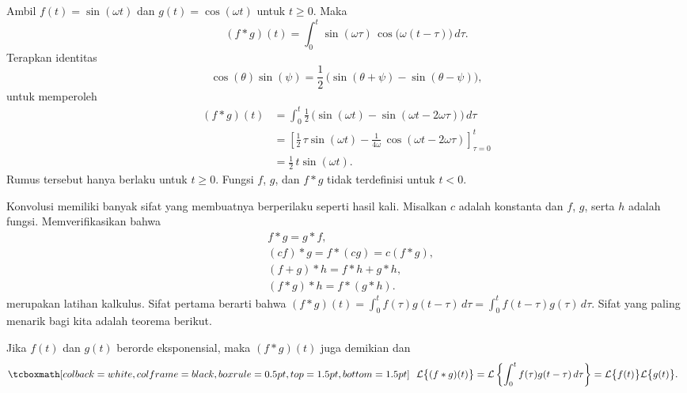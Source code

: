 \begin{example} \label{ltc:convsincosex}
Ambil $f(t) = \sin (\omega t)$ dan $g(t) = \cos (\omega t)$ untuk $t \geq 0$.
Maka 
\begin{equation*}
(f*g)(t)
=
\int_0^t  \sin ( \omega \tau ) \,
\cos \bigl( \omega (t-\tau) \bigr) \, d\tau .
\end{equation*}
Terapkan identitas
\begin{equation*}
\cos (\theta) \sin (\psi) =
\frac{1}{2} \, \bigl( \sin (\theta + \psi) - \sin (\theta - \psi) \bigr) ,
\end{equation*}
untuk memperoleh
\begin{equation*}
\begin{split}
(f*g)(t)
& =
\int_0^t
\frac{1}{2} \, \bigl( \sin (\omega t) - \sin (\omega t - 2 \omega \tau
) \bigr) \, d\tau
\\
& =
\left[ \frac{1}{2} \, \tau  \sin (\omega t) - \frac{1}{4\omega} \, \cos
(\omega t - 2 \omega \tau) \right]_{\tau=0}^t
\\
& = \frac{1}{2} \, t \sin (\omega t) .
\end{split}
\end{equation*}
Rumus tersebut hanya berlaku untuk $t \geq 0$.  Fungsi $f$, $g$,
dan $f*g$ tidak terdefinisi untuk $t < 0$.
\end{example}

Konvolusi memiliki banyak sifat yang membuatnya berperilaku seperti hasil kali.
Misalkan $c$ adalah konstanta dan $f$, $g$, serta $h$ adalah fungsi.
Memverifikasikan bahwa
\begin{align*}
& f * g = g * f , \\
& (c f) * g = f * (c g) = c (f*g) , \\
& (f+g) * h = f * h + g * h , \\
& ( f * g ) * h = f * ( g * h ) .
\end{align*}
merupakan latihan kalkulus. Sifat pertama berarti bahwa $(f * g)(t) =
\int_0^t f(\tau) g(t-\tau) \, d\tau = 
\int_0^t f(t-\tau) g(\tau) \, d\tau$.
Sifat yang paling menarik bagi kita adalah teorema berikut.

\begin{theorem}
Jika $f(t)$ dan $g(t)$ berorde eksponensial, maka
$(f*g)(t)$ juga demikian dan
\begin{equation*}
\mybxbg{~~
\mathcal{L} \bigl\{ (f*g)(t) \bigr\}
=
\mathcal{L} \left\{ \int_0^t f(\tau) g(t-\tau) \, d\tau \right\}
=
\mathcal{L} \bigl\{ f(t) \bigr\} \mathcal{L} \bigl\{ g(t) \bigr\} .
~~}
\end{equation*}
\end{theorem}

